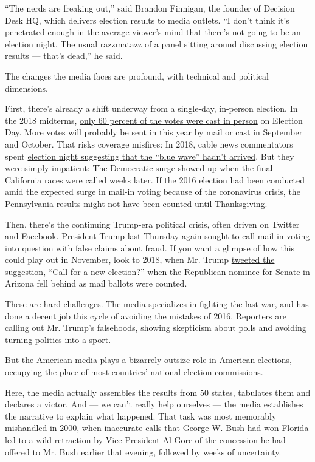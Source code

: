 ``The nerds are freaking out,'' said Brandon Finnigan, the founder of
Decision Desk HQ, which delivers election results to media outlets. ``I
don't think it's penetrated enough in the average viewer's mind that
there's not going to be an election night. The usual razzmatazz of a
panel sitting around discussing election results --- that's dead,'' he
said.

The changes the media faces are profound, with technical and political
dimensions.

First, there's already a shift underway from a single-day, in-person
election. In the 2018 midterms,
\href{https://www.census.gov/library/stories/2019/04/behind-2018-united-states-midterm-election-turnout.html}{only
60 percent of the votes were cast in person} on Election Day. More votes
will probably be sent in this year by mail or cast in September and
October. That risks coverage misfires: In 2018, cable news commentators
spent \href{https://www.youtube.com/watch?v=T6FQmy-1Cfc}{election night
suggesting that the ``blue wave'' hadn't arrived}. But they were simply
impatient: The Democratic surge showed up when the final California
races were called weeks later. If the 2016 election had been conducted
amid the expected surge in mail-in voting because of the coronavirus
crisis, the Pennsylvania results might not have been counted until
Thanksgiving.

Then, there's the continuing Trump-era political crisis, often driven on
Twitter and Facebook. President Trump last Thursday again
\href{https://www.nytimes.com/2020/07/30/us/elections/biden-vs-trump.html}{sought}
to call mail-in voting into question with false claims about fraud. If
you want a glimpse of how this could play out in November, look to 2018,
when Mr. Trump
\href{https://twitter.com/realDonaldTrump/status/1060993836984324096}{tweeted
the suggestion}, ``Call for a new election?'' when the Republican
nominee for Senate in Arizona fell behind as mail ballots were counted.

These are hard challenges. The media specializes in fighting the last
war, and has done a decent job this cycle of avoiding the mistakes of
2016. Reporters are calling out Mr. Trump's falsehoods, showing
skepticism about polls and avoiding turning politics into a sport.

But the American media plays a bizarrely outsize role in American
elections, occupying the place of most countries' national election
commissions.

Here, the media actually assembles the results from 50 states, tabulates
them and declares a victor. And --- we can't really help ourselves ---
the media establishes the narrative to explain what happened. That task
was most memorably mishandled in 2000, when inaccurate calls that George
W. Bush had won Florida led to a wild retraction by Vice President Al
Gore of the concession he had offered to Mr. Bush earlier that evening,
followed by weeks of uncertainty.

